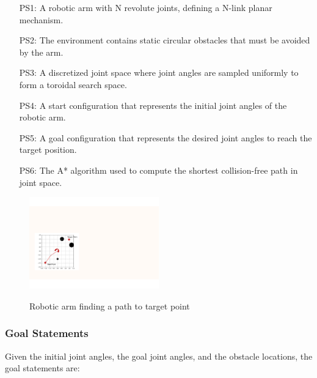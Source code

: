 \documentclass[12pt]{article}
\begin{document}
\begin{itemize}

  \item[PS1:] A robotic arm with N revolute joints, defining a N-link planar mechanism.
  
  \item[PS2:] The environment contains static circular obstacles that must be avoided by the arm.
  
  \item[PS3:] A discretized joint space where joint angles are sampled uniformly to form a toroidal search space.
  
  \item[PS4:] A start configuration that represents the initial joint angles of the robotic arm.
  
  \item[PS5:] A goal configuration that represents the desired joint angles to reach the target position.
  
  \item[PS6:] The A* algorithm used to compute the shortest collision-free path in joint space.
  
  \end{itemize}


\begin{figure}[h!]
\begin{center}
{
 \includegraphics[width=0.5\textwidth]{Physical System Description}
}
\caption{Robotic arm finding a path to target point}
\label{Fig:Robotic arm} 
\end{center}
\end{figure}

\subsubsection{Goal Statements} \label{sec_Goal}    

\noindent Given the initial joint angles, the goal joint angles, and the obstacle locations, the goal statements are:
\end{document}
